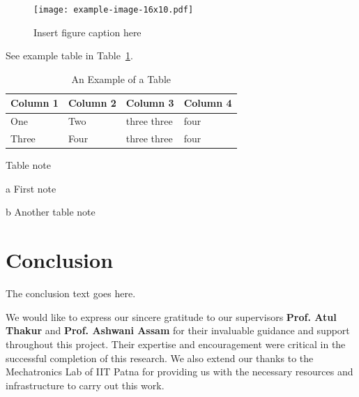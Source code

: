 \documentclass[
  journal=largetwo,
  manuscript=article-type,
  year=2023,
  volume=1,
]{iitp-journal}
\begin{document}

\begin{figure}[hbt!]
\centering
\texttt{[image: example-image-16x10.pdf]}
\caption{Insert figure caption here}
\label{fig_sim}
\end{figure}




See example table in Table~\ref{table_example}.

\begin{table}[hbt!]
\begin{threeparttable}
\caption{An Example of a Table}
\label{table_example}
\begin{tabular}{llll}
\toprule
\headrow Column 1 & Column 2  & Column 3 & Column 4\\
\midrule
One\tnote{a} & Two&three three &four\\ 
\midrule
Three & Four&three three\tnote{b} &four\\
\bottomrule
\end{tabular}
\begin{tablenotes}[hang]
\item[]Table note
\item[a]First note
\item[b]Another table note
\end{tablenotes}
\end{threeparttable}
\end{table}


\section{Conclusion}
The conclusion text goes here.


\begin{acknowledgement}
We would like to express our sincere gratitude to our supervisors \textbf{Prof. Atul Thakur} and \textbf{Prof. Ashwani Assam} for their invaluable guidance and support throughout this project. Their expertise and encouragement were critical in the successful completion of this research. We also extend our thanks to the Mechatronics Lab of IIT Patna for providing us with the necessary resources and infrastructure to carry out this work.
\end{acknowledgement}
\end{document}

